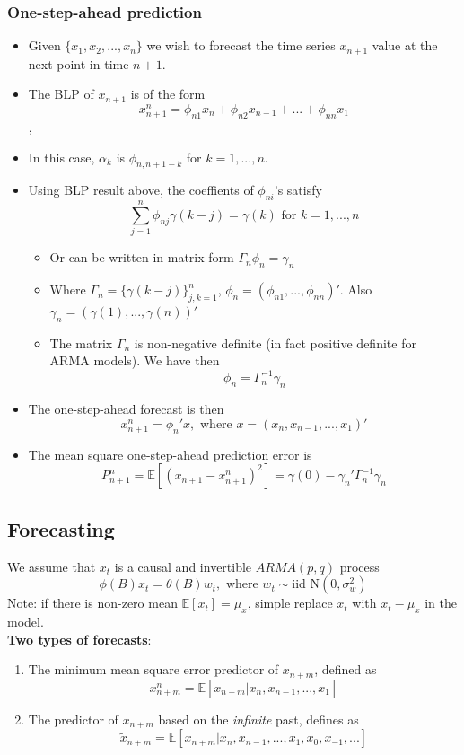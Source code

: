 \documentclass[11pt]{article}
\newcommand{\noi}{\noindent}
\begin{document}
\subsubsection{One-step-ahead prediction}
\begin{itemize}
    \item Given $\{ x_1,x_2,...,x_n \}$ we wish to forecast the time series $x_{n+1}$ value at the next point in time $n+1$.
    \item The BLP of $x_{n+1}$ is of the form
        $$x_{n+1}^n = \phi_{n1}x_n + \phi_{n2}x_{n-1} + ... + \phi_{nn}x_1$$,
    \item In this case, $\alpha_k$ is $\phi_{n,n+1-k}$ for $k=1,...,n$.
    \item Using BLP result above, the coeffients of $\phi_{ni}$'s satisfy
        $$\sum_{j=1}^{n}{\phi_{nj}\gamma(k-j)} = \gamma(k) \text{ for } k = 1,...,n$$
        \begin{itemize}
            \item Or can be written in matrix form $\Gamma_n\phi_n = \gamma_n$
            \item Where $\Gamma_n = \{\gamma(k-j)\}_{j,k=1}^{n}$, $\phi_n = (\phi_{n1},...,\phi_{nn})'$. Also $\gamma_n = (\gamma(1),...,\gamma(n))'$
            \item The matrix $\Gamma_n$ is non-negative definite (in fact positive definite for ARMA models). We have then
                $$\phi_n = \Gamma_n^{-1}\gamma_n$$
        \end{itemize}
    \item The one-step-ahead forecast is then
        $$x_{n+1}^n = \phi_{n}'x, \text{ where } x=(x_n,x_{n-1},...,x_1)'$$
    \item The mean square one-step-ahead prediction error is
        $$P_{n+1}^n = \mathbb{E}[(x_{n+1} - x_{n+1}^{n})^2] = \gamma(0) - \gamma_n'\Gamma_n^{-1}\gamma_n$$
\end{itemize}

\subsection{Forecasting}
\noi We assume that $x_t$ is a causal and invertible $ARMA(p, q)$ process
$$\phi(B)x_t = \theta(B)w_t, \text{ where } w_t \sim \text{iid N}(0, \sigma_w^2)$$
\noi Note: if there is non-zero mean $\mathbb{E}[x_t] = \mu_x$, simple replace $x_t$ with $x_t - \mu_x$ in the model. \\

\noi \textbf{Two types of forecasts}: \\
\begin{enumerate}
    \item The minimum mean square error predictor of $x_{n+m}$, defined as
        $$x_{n+m}^n = \mathbb{E}[x_{n+m}|x_n,x_{n-1},...,x_1]$$
    \item The predictor of $x_{n+m}$ based on the \textit{infinite} past, defines as
        $$\tilde{x}_{n+m} = \mathbb{E}[x_{n+m}|x_n,x_{n-1},...,x_1,x_0,x_{-1},...]$$
\end{enumerate} \phantom{i}
\end{document}
